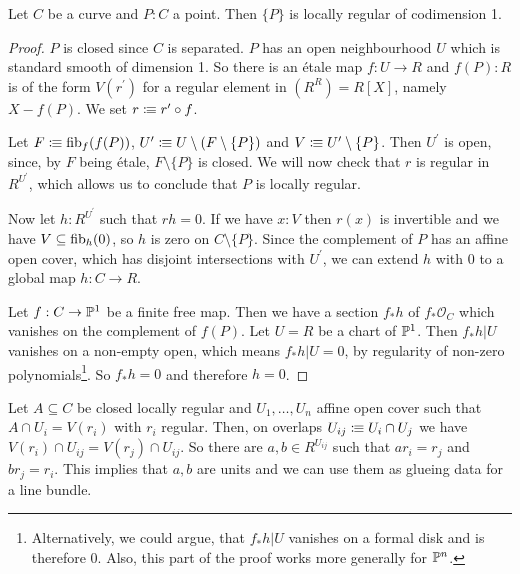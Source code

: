 \begin{lemma}
  Let \(C\) be a curve and \(P:C\) a point.
  Then \(\{P\}\) is locally regular of codimension 1.
\end{lemma}

\begin{proof}
  \(P\) is closed since \(C\) is separated.
  \(P\) has an open neighbourhood \(U\) which is standard smooth of dimension 1.
  So there is an étale map \(f:U\to R\) and \(f(P):R\) is of the form \(V(r^\prime)\) for a regular element in \((R^R)=R[X]\), namely \(X-f(P)\).
  We set \(r\vcentcolon\mspace{-1.2mu}\equiv r^\prime\circ f\).

Let \(F\vcentcolon\mspace{-1.2mu}\equiv \mathrm{fib}_f(f(P))\), \(U^\prime\vcentcolon\mspace{-1.2mu}\equiv U\setminus (F\setminus \{P\})\)  and \(V\vcentcolon\mspace{-1.2mu}\equiv U^\prime\setminus \{P\}\).
  Then \(U^\prime\) is open, since, by \(F\) being étale,
  \(F\setminus\{P\}\) is closed.
  We will now check that \(r\) is regular in \(R^{U^\prime}\), which allows us to conclude that \(P\) is locally regular.
  
  Now let \(h:R^{U^\prime}\) such that \(rh=0\).
  If we have \(x:V\) then \(r(x)\) is invertible and we have \(V\subseteq\mathrm{fib}_h(0)\), so \(h\) is zero on \(C\setminus\{P\}\).
  Since the complement of \(P\) has an affine open cover, which has disjoint intersections with \(U^\prime\), we can extend \(h\) with \(0\) to a global map \(h:C\to R\).

  Let \(f:C\to \mathbb{P}^1\) be a finite free map.
  Then we have a section \(f_\ast h\) of \(f_\ast \mathcal O_C\) which vanishes on the complement of \(f(P)\). Let \(U=R\) be a chart of \(\mathbb{P}^1\). Then \(f_\ast h|U\) vanishes on a non-empty open, which means \(f_\ast h|U=0\), by regularity of non-zero polynomials\footnote{Alternatively, we could argue, that \(f_\ast h|U\) vanishes on a formal disk and is therefore 0. Also, this part of the proof works more generally for \(\mathbb{P}^n\).}.
  So \(f_\ast h=0\) and therefore \(h=0\).
\end{proof}

Let \(A\subseteq C\) be closed locally regular and \(U_1,\dots,U_n\)  affine open cover such that \(A\cap U_i=V(r_i)\) with \(r_i\) regular.
Then, on overlaps \(U_{ij}\vcentcolon\mspace{-1.2mu}\equiv U_i\cap U_j\) we have \(V(r_i)\cap U_{ij}=V(r_j)\cap U_{ij}\). So there are \(a,b\in R^{U_{ij}}\) such that \(ar_i=r_j\) and \(br_j=r_i\). This implies that \(a,b\) are units and we can use them as glueing data for a line bundle.

